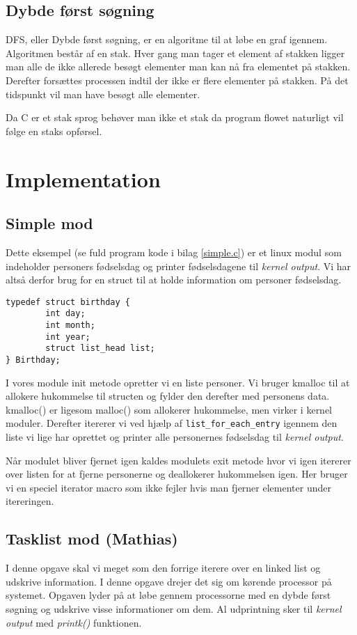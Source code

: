 \documentclass[danish]{report}
\begin{document}
\section{Dybde først søgning}
DFS, eller Dybde først søgning, er en algoritme til at løbe en graf igennem. Algoritmen består af en stak. Hver gang man tager et element af stakken ligger man alle de ikke allerede besøgt elementer man kan nå fra elementet på stakken. Derefter forsættes processen indtil der ikke er flere elementer på stakken. På det tidspunkt vil man have besøgt alle elementer.

Da C er et stak sprog behøver man ikke et stak da program flowet naturligt vil følge en staks opførsel.

\chapter{Implementation}
\section{Simple mod}

Dette eksempel (se fuld program kode i bilag \ref{simple.c}) er et linux modul som indeholder personers fødselsdag og printer fødselsdagene til \textit{kernel output}. Vi har altså derfor brug for en struct til at holde information om personer fødselsdag.

\begin{lstlisting}
typedef struct birthday {
        int day;
        int month;
        int year;
        struct list_head list;
} Birthday;
\end{lstlisting}

I vores module init metode opretter vi en liste personer. Vi bruger kmalloc til at allokere hukommelse til structen og fylder den derefter med personens data. kmalloc() er ligesom malloc() som allokerer hukommelse, men virker i kernel moduler. Derefter itererer vi ved hjælp af \texttt{list\_for\_each\_entry} igennem den liste vi lige har oprettet og printer alle personernes fødselsdag til \textit{kernel output}.

Når modulet bliver fjernet igen kaldes modulets exit metode hvor vi igen itererer over listen for at fjerne personerne og deallokerer hukommelsen igen. Her bruger vi en speciel iterator macro som ikke fejler hvis man fjerner elementer under itereringen.

\section{Tasklist mod (Mathias)}
I denne opgave skal vi meget som den forrige iterere over en linked list og udskrive information. I denne opgave drejer det sig om kørende processor på systemet. Opgaven lyder på at løbe gennem processorne med en dybde først søgning og udskrive visse informationer om dem. Al udprintning sker til \textit{kernel output} med \textit{printk()} funktionen.
\end{document}
